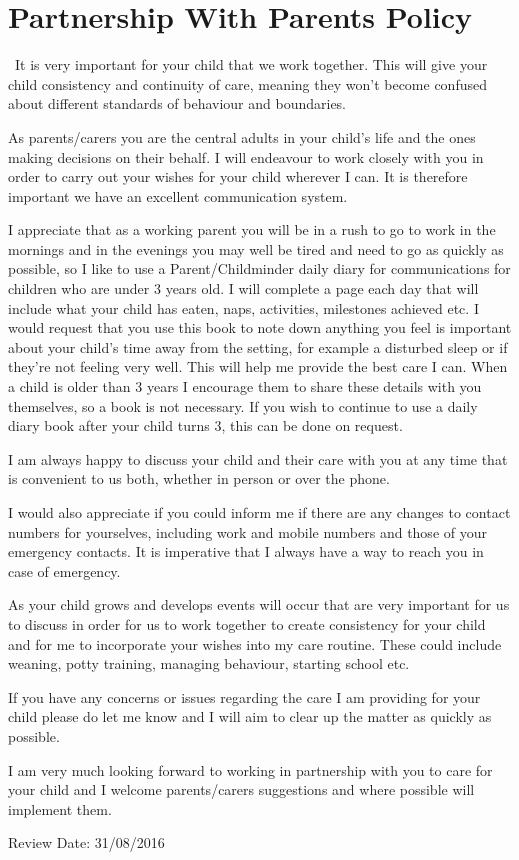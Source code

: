

\section{Partnership With Parents Policy}

~It is very important for your child that we work together. This will
give your child consistency and continuity of care, meaning they won't
become confused about different standards of behaviour and boundaries.

As parents/carers you are the central adults in your child's life and
the ones making decisions on their behalf. I will endeavour to work
closely with you in order to carry out your wishes for your child
wherever I can. It is therefore important we have an excellent
communication system.

I appreciate that as a working parent you will be in a rush to go to
work in the mornings and in the evenings you may well be tired and need
to go as quickly as possible, so I like to use a Parent/Childminder
daily diary for communications for children who are under 3 years old. I
will complete a page each day that will include what your child has
eaten, naps, activities, milestones achieved etc. I would request that
you use this book to note down anything you feel is important about your
child's time away from the setting, for example a disturbed sleep or if
they're not feeling very well. This will help me provide the best care I
can. When a child is older than 3 years I encourage them to share these
details with you themselves, so a book is not necessary. If you wish to
continue to use a daily diary book after your child turns 3, this can be
done on request.

I am always happy to discuss your child and their care with you at any
time that is convenient to us both, whether in person or over the phone.

I would also appreciate if you could inform me if there are any changes
to contact numbers for yourselves, including work and mobile numbers and
those of your emergency contacts. It is imperative that I always have a
way to reach you in case of emergency.

As your child grows and develops events will occur that are very
important for us to discuss in order for us to work together to create
consistency for your child and for me to incorporate your wishes into my
care routine. These could include weaning, potty training, managing
behaviour, starting school etc.

If you have any concerns or issues regarding the care I am providing for
your child please do let me know and I will aim to clear up the matter
as quickly as possible.

I am very much looking forward to working in partnership with you to
care for your child and I welcome parents/carers suggestions and where
possible will implement them.

Review Date: 31/08/2016


